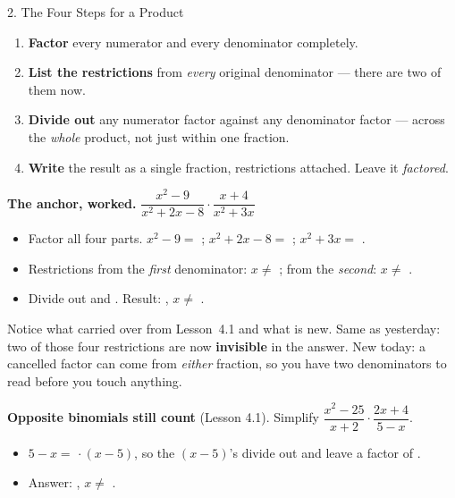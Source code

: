 \documentclass[10pt]{article}
\begin{document}
\begin{notesbox}{2. The Four Steps for a Product}
\begin{enumerate}[leftmargin=1.9em, itemsep=2pt]
  \item \textbf{Factor} every numerator and every denominator completely.
  \item \textbf{List the restrictions} from \emph{every} original denominator --- there are two of them now.
  \item \textbf{Divide out} any numerator factor against any denominator factor --- across the \emph{whole} product, not just within one fraction.
  \item \textbf{Write} the result as a single fraction, restrictions attached. Leave it \emph{factored}.
\end{enumerate}

\vspace{4pt}
\textbf{The anchor, worked.} \; $\dfrac{x^2-9}{x^2+2x-8}\cdot\dfrac{x+4}{x^2+3x}$
\begin{itemize}[leftmargin=1.5em, itemsep=3pt]
  \item Factor all four parts. \; $x^2-9=$ ; \quad $x^2+2x-8=$ ;
        \quad $x^2+3x=$ .
  \item Restrictions from the \emph{first} denominator: $x\neq$ ; \; from the
        \emph{second}: $x\neq$ .
  \item Divide out  and . \; Result: , \;
        $x\neq$ .
\end{itemize}

\vspace{3pt}
Notice what carried over from Lesson~4.1 and what is new. Same as yesterday: two of those four
restrictions are now \textbf{invisible} in the answer. New today: a cancelled factor can come from
\emph{either} fraction, so you have two denominators to read before you touch anything.

\vspace{5pt}
\textbf{Opposite binomials still count} (Lesson 4.1). Simplify
$\dfrac{x^2-25}{x+2}\cdot\dfrac{2x+4}{5-x}$.
\begin{itemize}[leftmargin=1.5em, itemsep=3pt]
  \item $5-x=$  $\cdot\,(x-5)$, so the $(x-5)$'s divide out and leave a factor of
        .
  \item Answer: , \; $x\neq$ .
\end{itemize}
\end{notesbox}
\end{document}
